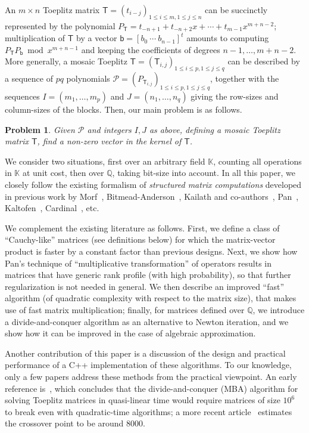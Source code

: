 \documentclass[sigconf]{acmart}
\newcommand{\vb}{\ensuremath{\mathsf{b}}}
\newcommand{\mT}{\ensuremath{\mathsf{T}}}
\newcommand{\K}{\ensuremath{\mathbb{K}}}
\newcommand{\Q}{\ensuremath{\mathbb{Q}}}
\renewcommand{\P}{\ensuremath{\mathscr{P}}}
\newtheorem{pbm}{Problem}
\theoremstyle{acmdefinition}
\begin{document}
An $m \times n$ Toeplitz matrix
$\mT=(t_{i-j})_{1\le i \le m, 1 \le j \le n}$ can be succinctly
represented by the polynomial
$P_\mT=t_{-n+1} + t_{-n+2} x + \cdots + t_{m-1} x^{m+n-2}$;
multiplication of $\mT$ by a vector $\vb=[b_0~\cdots~b_{n-1}]^t$
amounts to computing $P_\mT P_\vb \bmod x^{m+n-1}$ and keeping the
coefficients of degrees $n-1,\dots,m+n-2$.  More generally, a mosaic
Toeplitz $\mT=(\mT_{i,j})_{1 \le i \le p,1 \le j \le q}$ can be
described by a sequence of $pq$  polynomials
$\P=(P_{\mT_{i,j}})_{1 \le i \le p,1 \le j \le q}$, together
with the sequences $I=(m_1,\dots,m_p)$ and $J=(n_1,\dots,n_q)$ giving
the row-sizes and column-sizes of the blocks. Then, our main
problem is as follows.
%
\vspace{-5px}
\begin{pbm}\label{pb:mosaic}
  Given $\P$ and integers $I,J$ as above, 
  defining a mosaic Toeplitz matrix $\mT$, find a non-zero
  vector in the kernel of $\mT$.
\end{pbm}
\vspace{-5px}
%
We consider two situations, first over an arbitrary field $\K$,
counting all operations in $\K$ at unit cost, then over $\Q$, taking
bit-size into account. In all this paper, we closely follow the
existing formalism of {\em structured matrix computations} developed
in previous work by Morf~\cite{Morf80},
Bitmead-Anderson~\cite{BiAn80}, Kailath and
co-authors~\cite{KaKuMo79,KaSa99}, Pan~\cite{Pan90,Pan92},
Kaltofen~\cite{Kaltofen94}, Cardinal~\cite{Cardinal99}, etc.

We complement the existing literature as follows. First, we define a
class of ``Cauchy-like'' matrices (see definitions below) for which
the matrix-vector product is faster by a constant factor than previous
designs. Next, we show how Pan's technique of ``multiplicative
transformation'' of operators results in matrices that have generic
rank profile (with high probability), so that further regularization
is not needed in general. We then describe an improved ``fast''
algorithm (of quadratic complexity with respect to the matrix size),
that makes use of fast matrix multiplication; finally, for matrices
defined over $\Q$, we introduce a divide-and-conquer algorithm as an
alternative to Newton iteration, and we show how it can be improved in
the case of algebraic approximation.

Another contribution of this paper is a discussion of the design and
practical performance of a C++ implementation of these algorithms.  To
our knowledge, only a few papers address these methods from the
practical viewpoint. An early reference is~\cite{SeShSp82}, which
concludes that the divide-and-conquer (MBA) algorithm for solving
Toeplitz matrices in quasi-linear time would require matrices of size
$10^6$ to break even with quadratic-time algorithms; a more recent
article~\cite{Huckle94} estimates the crossover point to be around
$8000$. 
\end{document}
